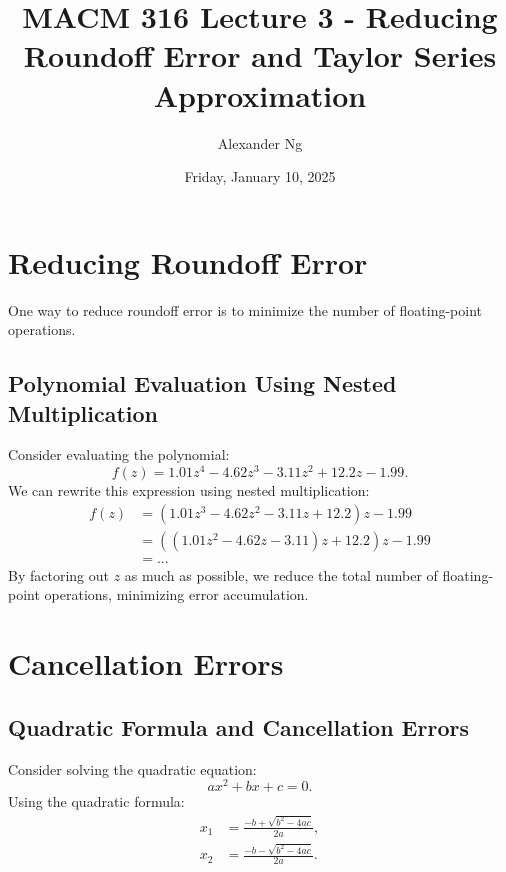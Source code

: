\documentclass[12pt]{article}
\begin{document}
\title{MACM 316 Lecture 3 - Reducing Roundoff Error and Taylor Series Approximation}
\author{Alexander Ng}
\date{Friday, January 10, 2025}

\maketitle
\section{Reducing Roundoff Error}

One way to reduce roundoff error is to minimize the number of floating-point 
operations.

\subsection{Polynomial Evaluation Using Nested Multiplication}

Consider evaluating the polynomial:
\begin{equation*}
    f(z) = 1.01z^4 - 4.62z^3 - 3.11z^2 + 12.2z - 1.99.
\end{equation*}
We can rewrite this expression using nested multiplication:
\begin{align*}
    f(z) &= (1.01z^3 - 4.62z^2 - 3.11z + 12.2)z - 1.99 \\
         &= ((1.01z^2 - 4.62z - 3.11)z + 12.2)z - 1.99 \\
         &= \dots
\end{align*}
By factoring out $z$ as much as possible, we reduce the total number of 
floating-point operations, minimizing error accumulation.

\section{Cancellation Errors}

\subsection{Quadratic Formula and Cancellation Errors}

Consider solving the quadratic equation:
\begin{equation*}
    ax^2 + bx + c = 0.
\end{equation*}
Using the quadratic formula:
\begin{align*}
    x_1 &= \frac{-b + \sqrt{b^2 - 4ac}}{2a}, \\
    x_2 &= \frac{-b - \sqrt{b^2 - 4ac}}{2a}.
\end{align*}
\end{document}
